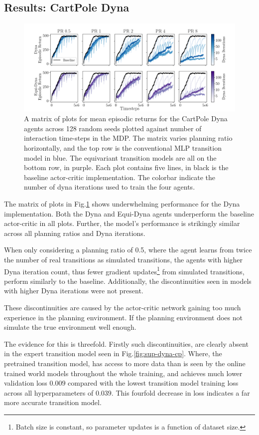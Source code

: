 \subsection{Results: CartPole Dyna}
\begin{figure}[h!]
	\centering
	\includegraphics[width=\textwidth]{Figures/dyna_sweep_cp.png}
	\caption{A matrix of plots for mean episodic returns for the CartPole Dyna agents across 128 random seeds
		plotted against number of interaction time-steps in the MDP. The matrix varies planning ratio horizontally, and the top row is the conventional MLP transition model in blue. The equivariant transition models are all on the bottom row, in purple. Each plot contains five lines, in black is the baseline actor-critic implementation. The colorbar indicate the number of dyna iterations used to train the four agents.}
	\label{fig:cp_dyna}
\end{figure}

The matrix of plots in Fig.\ref{fig:cp_dyna} shows underwhelming performance for the Dyna implementation. Both the Dyna and Equi-Dyna agents underperform the baseline actor-critic in all plots. Further, the model's performance is strikingly similar across all planning ratios and Dyna iterations.

When only considering a planning ratio of 0.5, where the agent learns from twice the number of real transitions as simulated transitions, the agents with higher Dyna iteration count, thus fewer gradient updates\footnote{Batch size is constant, so parameter updates is a function of dataset size.} from simulated transitions, perform similarly to the baseline. Additionally, the discontinuities seen in models with higher Dyna iterations were not present.

These discontinuities are caused by the actor-critic network gaining too much experience in the planning environment. If the planning environment does not simulate the true environment well enough.

The evidence for this is threefold. Firstly such discontinuities, are clearly absent in the expert transition model seen in Fig.\ref{fig:sup-dyna-cp}. Where, the pretrained transition model, has access to more data than is seen by the online trained world models throughout the whole training, and achieves much lower validation loss $0.009$ compared with the lowest transition model training loss across all hyperparameters of $0.039$. This fourfold decrease in loss indicates a far more accurate transition model.


